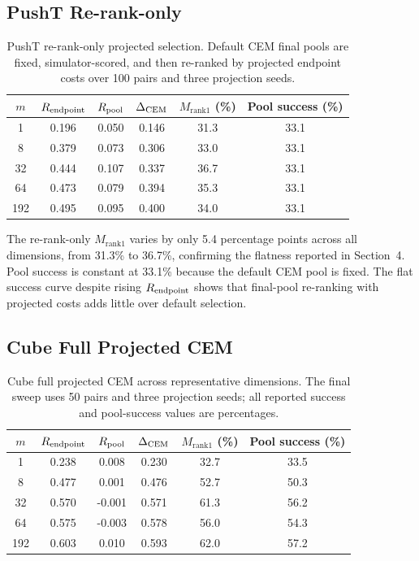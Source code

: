 \subsection{PushT Re-rank-only}
\label{app:stage1b_pusht_rerank}

\begin{table}[h]
\centering
\caption{PushT re-rank-only projected selection.  Default CEM final pools
are fixed, simulator-scored, and then re-ranked by projected endpoint costs
over 100 pairs and three projection seeds.}
\label{tab:g-pusht-rerank}
\small
\begin{tabular}{cccccc}
\toprule
$m$ & $R_\text{endpoint}$ & $R_\text{pool}$ & $\Delta_\text{CEM}$ & $M_{\text{rank1}}$ (\%) & Pool success (\%) \\
\midrule
1 & 0.196 & 0.050 & 0.146 & 31.3 & 33.1 \\
8 & 0.379 & 0.073 & 0.306 & 33.0 & 33.1 \\
32 & 0.444 & 0.107 & 0.337 & 36.7 & 33.1 \\
64 & 0.473 & 0.079 & 0.394 & 35.3 & 33.1 \\
192 & 0.495 & 0.095 & 0.400 & 34.0 & 33.1 \\
\bottomrule
\end{tabular}
\end{table}

The re-rank-only $M_{\text{rank1}}$ varies by only 5.4 percentage points
across all dimensions, from 31.3\% to 36.7\%, confirming the flatness
reported in Section~4.  Pool success is constant at 33.1\% because the
default CEM pool is fixed.  The flat success curve despite rising
$R_\text{endpoint}$ shows that final-pool re-ranking with projected costs adds
little over default selection.

\subsection{Cube Full Projected CEM}
\label{app:stage1b_cube_full}

\begin{table}[h]
\centering
\caption{Cube full projected CEM across representative dimensions.  The
final sweep uses 50 pairs and three projection seeds; all reported success
and pool-success values are percentages.}
\label{tab:g-cube-full}
\small
\begin{tabular}{cccccc}
\toprule
$m$ & $R_\text{endpoint}$ & $R_\text{pool}$ & $\Delta_\text{CEM}$ & $M_{\text{rank1}}$ (\%) & Pool success (\%) \\
\midrule
1 & 0.238 & 0.008 & 0.230 & 32.7 & 33.5 \\
8 & 0.477 & 0.001 & 0.476 & 52.7 & 50.3 \\
32 & 0.570 & -0.001 & 0.571 & 61.3 & 56.2 \\
64 & 0.575 & -0.003 & 0.578 & 56.0 & 54.3 \\
192 & 0.603 & 0.010 & 0.593 & 62.0 & 57.2 \\
\bottomrule
\end{tabular}
\end{table}

